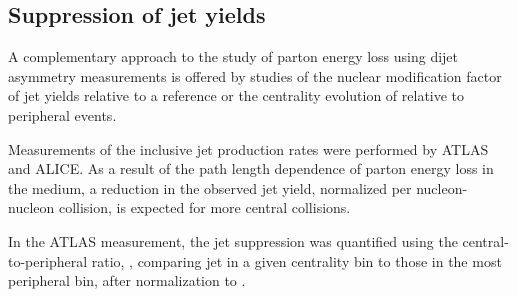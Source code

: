 \subsection{Suppression of jet yields}

A complementary approach to the study of parton energy loss using dijet asymmetry measurements
is offered by studies of the nuclear modification factor \Raa of jet yields relative 
to a \pp reference or the centrality evolution of \Rcp relative to peripheral events.

Measurements of the inclusive jet production rates were performed by ATLAS and ALICE.
As a result of the path length dependence of parton energy loss in the medium, 
\cite{Armesto:2011ht} a reduction in the observed jet yield, normalized per 
nucleon-nucleon collision, is expected for more central collisions.

In the ATLAS measurement, the jet suppression was quantified using the central-to-peripheral ratio, 
\Rcp, comparing jet in a given centrality bin to those in the most peripheral bin, after 
normalization to \Ncoll.

